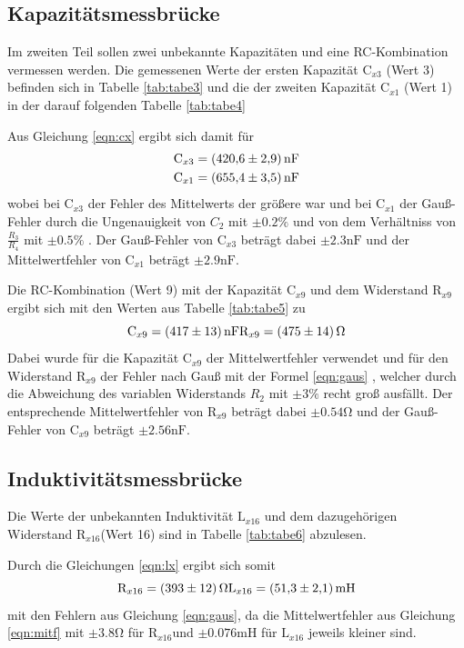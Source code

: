 \subsection{Kapazitätsmessbrücke}
Im zweiten Teil sollen zwei unbekannte Kapazitäten und eine RC-Kombination
vermessen werden. Die gemessenen Werte der ersten Kapazität $ \text{C}_{x3} $ (Wert 3) befinden
sich in Tabelle \ref{tab:tabe3} und die der zweiten Kapazität $ \text{C}_{x1} $
(Wert 1) in der
darauf folgenden Tabelle \ref{tab:tabe4}


\noindent Aus Gleichung \ref{eqn:cx}
ergibt sich damit für
\begin{align*}
  \text{C}_{x3} = \SI{420.6 (29)}{\nano\farad} \\
  \text{C}_{x1} = \SI{655.4 (35)}{\nano\farad}
\end{align*}
wobei bei $ \text{C}_{x3} $ der Fehler des Mittelwerts der größere war und bei
$ \text{C}_{x1} $ der Gauß-Fehler durch die Ungenauigkeit von $C_2$ mit $ \pm 0.2
\% $ und von dem Verhältniss von $ \frac{R_3}{R_4} $ mit $ \pm 0.5 \% $ .
Der Gauß-Fehler von $ \text{C}_{x3} $ beträgt
dabei $ \pm 2.3 \si{\nano\farad} $ und der Mittelwertfehler von $ \text{C}_{x1} $
beträgt $ \pm 2.9 \si{\nano\farad} $.


\noindent Die RC-Kombination (Wert 9) mit der Kapazität $ \text{C}_{x9} $ und dem
Widerstand $ \text{R}_{x9} $ ergibt sich
mit den Werten aus Tabelle \ref{tab:tabe5} zu
\begin{equation*}
  \text{C}_{x9} = \SI{417 (13)}{\nano\farad} \\
  \text{R}_{x9} = \SI{475 (14)}{\ohm}
\end{equation*}
Dabei wurde für die Kapazität $ \text{C}_{x9} $ der Mittelwertfehler verwendet und
für den Widerstand $ \text{R}_{x9} $ der Fehler nach Gauß mit der Formel \ref{eqn:gaus}
, welcher durch die Abweichung des variablen Widerstands $R_2$ mit $ \pm 3 \% $
recht groß ausfällt. Der entsprechende Mittelwertfehler von $ \text{R}_{x9} $
beträgt dabei $ \pm 0.54 \si{\ohm} $ und der Gauß-Fehler von $ \text{C}_{x9} $ beträgt
$ \pm 2.56 \si{\nano\farad} $.


\subsection{Induktivitätsmessbrücke}

Die Werte der unbekannten Induktivität $ \text{L}_{x16} $ und dem dazugehörigen
Widerstand $ \text{R}_{x16} $(Wert 16) sind in Tabelle
\ref{tab:tabe6} abzulesen.

Durch die Gleichungen \ref{eqn:lx}
ergibt sich somit
\begin{equation*}
  \text{R}_{x16} = \SI{393 (12)}{\ohm} \\
  \text{L}_{x16} = \SI{51.3 (21)}{\milli\henry}
\end{equation*}
mit den Fehlern aus Gleichung \ref{eqn:gaus}, da die Mittelwertfehler aus Gleichung
\ref{eqn:mitf} mit
$ \pm 3.8 \si{\ohm} $ für $ \text{R}_{x16} $und $ \pm 0.076 \si{\milli\henry} $
für $ \text{L}_{x16} $ jeweils kleiner sind.

